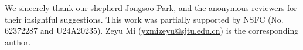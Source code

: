 \begin{acks}
We sincerely thank our shepherd Jongsoo Park, and the anonymous reviewers for their insightful suggestions.
This work was partially supported by NSFC (No. 62372287 and U24A20235).
Zeyu Mi (\href{mailto:yzmizeyu@sjtu.edu.cn}{yzmizeyu@sjtu.edu.cn}) is the corresponding author.
\end{acks}
